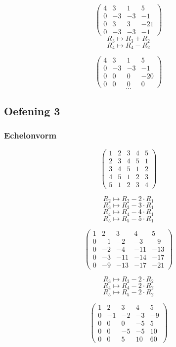 \documentclass[lineaire_algebra_oplossingen.tex]{subfiles}
\begin{document}
\[
\begin{pmatrix}
4 & 3 & 1 & 5\\
0 & -3 & -3 & -1\\
0 & 3 & 3 & -21\\
0 & -3 & -3 & -1
\end{pmatrix}
\]
\[ R_3 \longmapsto R_3 + R_2\]
\[ R_4 \longmapsto R_4 - R_2\]

\[
\begin{pmatrix}
4 & 3 & 1 & 5\\
0 & -3 & -3 & -1\\
0 & 0 & 0 & -20\\
0 & 0 & 0 & 0
\end{pmatrix}
\]
\[...\]
\subsection{Oefening 3}
\subsubsection*{Echelonvorm}
\[
\begin{pmatrix}
1 &  2 &  3 &  4 &  5\\
2 &  3 &  4 &  5 &  1\\
3 &  4 &  5 &  1 &  2\\
4 &  5 &  1 &  2 &  3\\
5 &  1 &  2 &  3 &  4 
\end{pmatrix}
\]

\[ R_2 \longmapsto R_2 -2\cdot R_1\]
\[ R_3 \longmapsto R_3 -3\cdot R_1\]
\[ R_4 \longmapsto R_4 -4\cdot R_1\]
\[ R_5 \longmapsto R_5 -5\cdot R_1\]

\[
\begin{pmatrix}
1 &  2 &  3 &  4 &  5 \\
0 & -1 & -2 & -3 & -9 \\
0 & -2 & -4 & -11& -13\\
0 & -3 & -11& -14& -17\\
0 & -9 & -13& -17& -21
\end{pmatrix}
\]

\[ R_3 \longmapsto R_3 -2\cdot R_2\]
\[ R_4 \longmapsto R_4 -2\cdot R_2\]
\[ R_5 \longmapsto R_5 -2\cdot R_2\]

\[
\begin{pmatrix}
1 &  2 &  3 &  4 &  5\\
0 & -1 & -2 & -3 & -9\\
0 &  0 &  0 & -5 &  5\\
0 &  0 & -5 & -5 & 10\\
0 &  0 &  5 & 10 & 60 
\end{pmatrix}
\]
\end{document}
